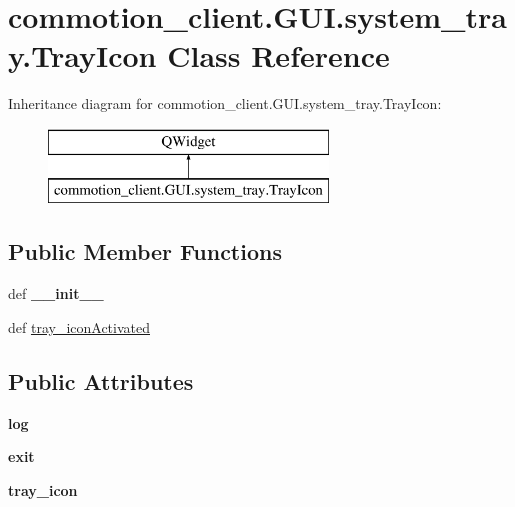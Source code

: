 \hypertarget{classcommotion__client_1_1GUI_1_1system__tray_1_1TrayIcon}{\section{commotion\-\_\-client.\-G\-U\-I.\-system\-\_\-tray.\-Tray\-Icon Class Reference}
\label{classcommotion__client_1_1GUI_1_1system__tray_1_1TrayIcon}
}
Inheritance diagram for commotion\-\_\-client.\-G\-U\-I.\-system\-\_\-tray.\-Tray\-Icon\-:\begin{figure}[H]
\begin{center}
\leavevmode
\includegraphics[height=2.000000cm]{classcommotion__client_1_1GUI_1_1system__tray_1_1TrayIcon}
\end{center}
\end{figure}
\subsection*{Public Member Functions}
\begin{DoxyCompactItemize}
\item 
\hypertarget{classcommotion__client_1_1GUI_1_1system__tray_1_1TrayIcon_aca280c4231a261edb8caacd712931840}{def {\bfseries \-\_\-\-\_\-init\-\_\-\-\_\-}}\label{classcommotion__client_1_1GUI_1_1system__tray_1_1TrayIcon_aca280c4231a261edb8caacd712931840}

\item 
def \hyperlink{classcommotion__client_1_1GUI_1_1system__tray_1_1TrayIcon_a31999bfda4008b7395def282e37b4d5c}{tray\-\_\-icon\-Activated}
\end{DoxyCompactItemize}
\subsection*{Public Attributes}
\begin{DoxyCompactItemize}
\item 
\hypertarget{classcommotion__client_1_1GUI_1_1system__tray_1_1TrayIcon_acf0eb7b591dfcf509b0d5eb0d57247dc}{{\bfseries log}}\label{classcommotion__client_1_1GUI_1_1system__tray_1_1TrayIcon_acf0eb7b591dfcf509b0d5eb0d57247dc}

\item 
\hypertarget{classcommotion__client_1_1GUI_1_1system__tray_1_1TrayIcon_a3a048d00c09481b8655b1b6ea357b4e0}{{\bfseries exit}}\label{classcommotion__client_1_1GUI_1_1system__tray_1_1TrayIcon_a3a048d00c09481b8655b1b6ea357b4e0}

\item 
\hypertarget{classcommotion__client_1_1GUI_1_1system__tray_1_1TrayIcon_a1d5c21e34150d0320feeaecce88e42d9}{{\bfseries tray\-\_\-icon}}\label{classcommotion__client_1_1GUI_1_1system__tray_1_1TrayIcon_a1d5c21e34150d0320feeaecce88e42d9}

\end{DoxyCompactItemize}
